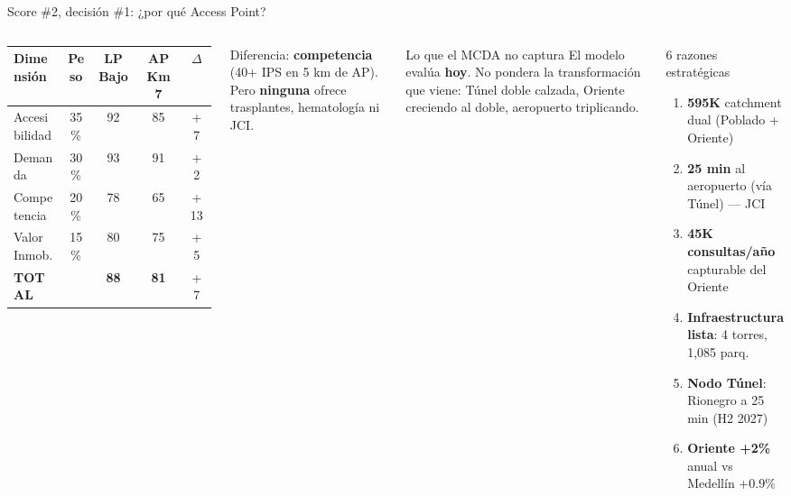\documentclass[aspectratio=169, 11pt]{beamer}
\begin{document}
{
\begin{frame}{Score \#2, decisión \#1: ¿por qué Access Point?}

\vspace{-2pt}
\begin{columns}[T]
{\scriptsize\setlength{\tabcolsep}{3pt}
\begin{tabular}{@{}lcccc@{}}
\toprule
\textbf{Dimensión} & \textbf{Peso} & \textbf{LP Bajo} & \textbf{AP Km 7} & \textbf{$\Delta$} \\
\midrule
\rowcolor{teal!6}
Accesibilidad & 35\% & 92 & 85 & +7 \\
Demanda & 30\% & 93 & 91 & +2 \\
\rowcolor{coral!6}
Competencia & 20\% & 78 & 65 & +13 \\
Valor Inmob. & 15\% & 80 & 75 & +5 \\
\midrule
\textbf{TOTAL} & & \textbf{88} & \textbf{81} & +7 \\
\bottomrule
\end{tabular}
}

\vspace{3pt}
{\scriptsize Diferencia: \textbf{competencia} (40+ IPS en 5 km de AP). Pero \textbf{ninguna} ofrece trasplantes, hematología ni JCI.}

\vspace{3pt}
\begin{block}{\small Lo que el MCDA no captura}
\scriptsize
El modelo evalúa \textbf{hoy}. No pondera la transformación que viene: Túnel doble calzada, Oriente creciendo al doble, aeropuerto triplicando.
\end{block}

\vspace{-2pt}
\begin{exampleblock}{\small 6 razones estratégicas}
\scriptsize
\begin{enumerate}\setlength{\itemsep}{1pt}\setlength{\parskip}{0pt}
  \item \textbf{595K} catchment dual (Poblado + Oriente)
  \item \textbf{25 min} al aeropuerto (vía Túnel) --- JCI
  \item \textbf{45K consultas/año} capturable del Oriente
  \item \textbf{Infraestructura lista}: 4 torres, 1,085 parq.
  \item \textbf{Nodo Túnel}: Rionegro a 25 min (H2 2027)
  \item \textbf{Oriente +2\%} anual vs Medellín +0.9\%
\end{enumerate}
\end{exampleblock}
\end{columns}


\end{frame}}
\end{document}
